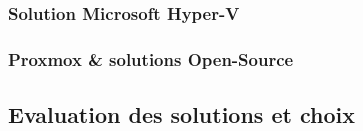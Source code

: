 \subsubsection{Solution Microsoft Hyper-V}

\subsubsection{Proxmox \& solutions Open-Source}


\subsection{Evaluation des solutions et choix}
